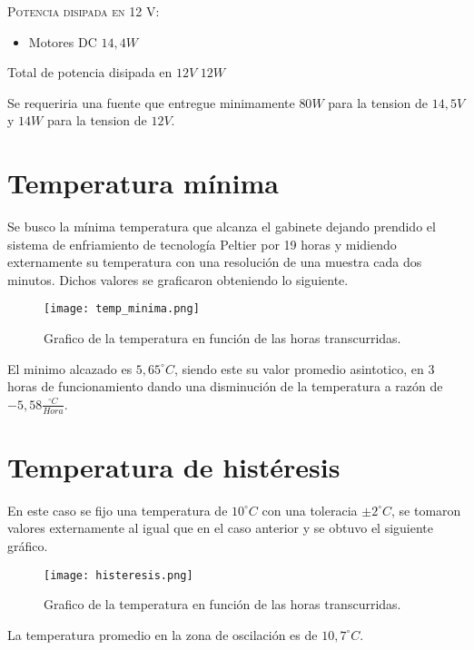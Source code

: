\documentclass[a4paper]{article}
\numberwithin{equation}{section}
\numberwithin{figure}{section}
\begin{document}
\textsc{\Large Potencia disipada en 12 V:}

\begin{itemize}
\item Motores DC $14,4 W$
\end{itemize}

Total de potencia disipada en $12V$ $12W$

Se requeriria una fuente que entregue minimamente $80W$ para la tension de $14,5V$ y $14W$ para la tension de $12V$.

\pagebreak

\section{Temperatura mínima}

Se busco la mínima temperatura que alcanza el gabinete dejando prendido el sistema de enfriamiento de tecnología Peltier por 19 horas y midiendo externamente su temperatura con una resolución de una muestra cada dos minutos. Dichos valores se graficaron obteniendo lo siguiente.

\begin{figure}[H]\label{temperatura_minima}
\centering
\texttt{[image: temp\_minima.png]}
\caption{Grafico de la temperatura en función de las horas transcurridas.}
\end{figure}

El minimo alcazado es $5,65^{\circ} C$, siendo este su valor promedio asintotico, en 3 horas de funcionamiento dando una disminución de la temperatura a razón de $-5,58\frac{^{\circ}C}{Hora}$.

\pagebreak

\section{Temperatura de histéresis}

En este caso se fijo una temperatura de $10^{\circ} C$  con una toleracia $\pm 2^{\circ} C$, se tomaron valores externamente al igual que en el caso anterior y se obtuvo el siguiente gráfico.


\begin{figure}[H]\label{histeresis}
\centering
\texttt{[image: histeresis.png]}
\caption{Grafico de la temperatura en función de las horas transcurridas.}
\end{figure}

La temperatura promedio en la zona de oscilación es de $10,7^{\circ} C$.
\end{document}

